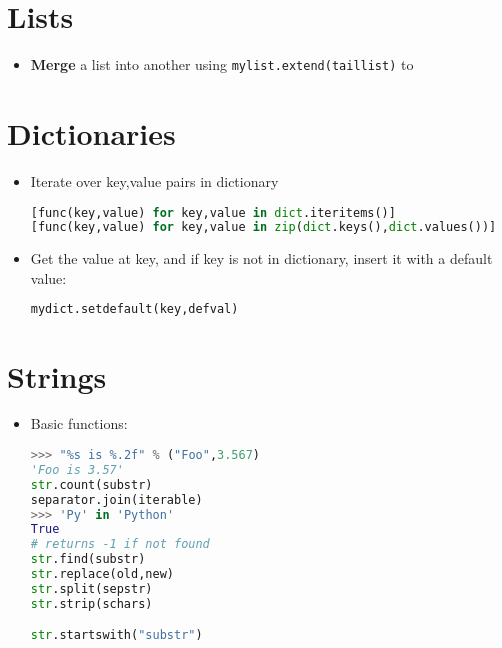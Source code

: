 \documentclass[11pt]{article}
\begin{document}
\begin{multicols*}{3}
\section{Lists}
\begin{itemize}[wide = 4pt, labelindent=\parindent]
\item \textbf{Merge} a list into another using \verb+mylist.extend(taillist)+ to 
\end{itemize}


\section{Dictionaries}
\begin{itemize}[wide = 4pt, labelindent=\parindent]

\item Iterate over key,value pairs in dictionary
  \vspace{2pt}
\begin{lstlisting}[language=Python,linewidth=0.95\linewidth]
[func(key,value) for key,value in dict.iteritems()]
[func(key,value) for key,value in zip(dict.keys(),dict.values())]
\end{lstlisting}

  \item Get the value at key, and if key is not in dictionary, insert it with a default value:
\vspace{2pt}
\begin{lstlisting}[language=Python,linewidth=0.95\linewidth]
mydict.setdefault(key,defval)
\end{lstlisting}
\end{itemize}

\section{Strings}
\begin{itemize}[wide = 4pt, labelindent=\parindent]
\item Basic functions:
\begin{lstlisting}[language=Python,linewidth=0.95\linewidth]
>>> "%s is %.2f" % ("Foo",3.567)
'Foo is 3.57'
str.count(substr)
separator.join(iterable)
>>> 'Py' in 'Python'
True
# returns -1 if not found
str.find(substr)
str.replace(old,new)
str.split(sepstr)
str.strip(schars)

str.startswith("substr")
\end{lstlisting}
  
\end{itemize}


\end{multicols*}
\end{document}
